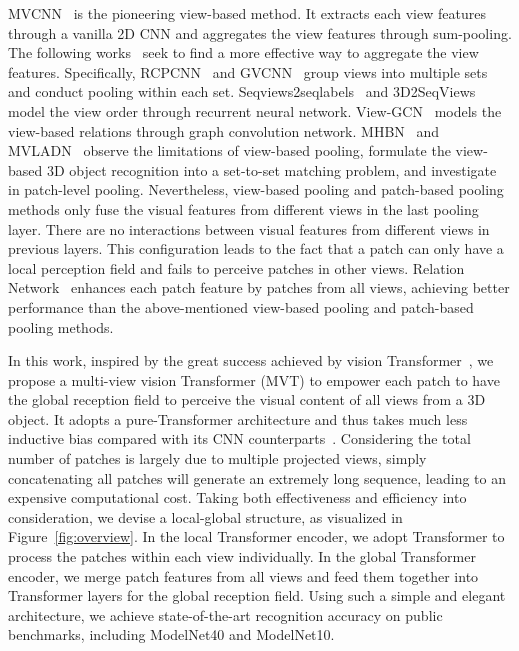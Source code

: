 \documentclass{bmvc2k}
\begin{document}
MVCNN~\cite{su2015multi} is the pioneering view-based method. It extracts each view features through a vanilla 2D CNN and aggregates the view features through sum-pooling.  The following works~\cite{wang2017dominant,feng2018gvcnn,kanezaki2018rotationnet,DBLP:journals/tip/HanSLVLZHC19,DBLP:journals/tip/HanLLVLZHC19,Wei_2020_CVPR} seek to find a more effective way to aggregate the view features. Specifically, RCPCNN~\cite{wang2017dominant} and GVCNN~\cite{feng2018gvcnn} group views into multiple sets and conduct pooling within each set. Seqviews2seqlabels~\cite{DBLP:journals/tip/HanSLVLZHC19} and 3D2SeqViews~\cite{DBLP:journals/tip/HanLLVLZHC19} model the view order through recurrent neural network. View-GCN~\cite{Wei_2020_CVPR} models the view-based relations through graph convolution network. MHBN~\cite{yu2018multi} and MVLADN~\cite{DBLP:journals/tip/YuMYY21} observe the limitations of view-based pooling, formulate the view-based $3$D object recognition into a set-to-set matching problem, and investigate in patch-level pooling. Nevertheless,  view-based pooling and patch-based pooling methods only fuse the visual features from different views in the last pooling layer. There are no interactions between visual features from different views in previous layers. This configuration leads to the fact that a  patch can only have a local perception field and fails to perceive patches in other views. Relation Network~\cite{mvrelations} enhances each patch feature by patches from all views, achieving better performance than the above-mentioned view-based pooling and patch-based pooling methods.

In this work, inspired by the great success achieved by vision Transformer~\cite{dosovitskiy2020image,touvron2020training}, we propose a multi-view vision Transformer (MVT) to empower each patch to have the global reception field to perceive the visual content of all views from a 3D object. It adopts a pure-Transformer architecture and thus takes much less inductive bias compared with its CNN counterparts~\cite{dosovitskiy2020image}. Considering the total number of patches is largely due to multiple projected views, simply concatenating all patches will generate an extremely long sequence, leading to an expensive computational cost.  Taking both effectiveness and efficiency into consideration, we devise a local-global structure, as visualized in Figure~\ref{fig:overview}. In the local Transformer encoder, we adopt Transformer to process the patches within each view individually. In the global Transformer encoder, we merge patch features from all views and feed them together into Transformer layers for the global reception field. Using such a simple and elegant architecture, we achieve state-of-the-art recognition accuracy on public benchmarks, including ModelNet40 and  ModelNet10.
\end{document}
